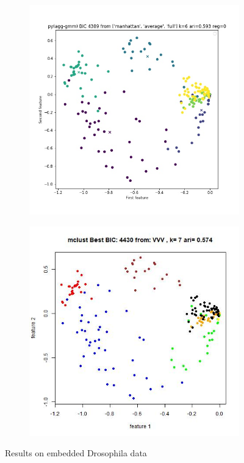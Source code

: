 \documentclass{article}
\begin{document}
\begin{figure}[h!]
\begin{subfigure}[b]{0.35\linewidth}
\caption{}
\end{subfigure} 
\begin{subfigure}[b]{0.35\linewidth}
  \includegraphics[width=\linewidth]{drosophila_python_bestbic.jpg}
\caption{}
\end{subfigure}
\begin{subfigure}[b]{0.35\linewidth}
  \includegraphics[width=\linewidth]{drosophila_r_bestbic.jpg}
\caption{}
\end{subfigure} 

\caption{Results on embedded Drosophila data}
\end{figure}
\end{document}
